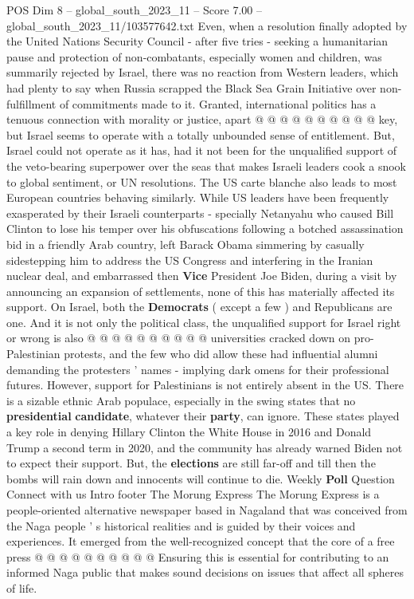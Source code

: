 \begin{textsample}{POS Dim 8 – global\_south\_2023\_11 – Score 7.00 – global\_south\_2023\_11/103577642.txt}
Even, when a resolution finally adopted by the United Nations Security Council - after five tries - seeking a humanitarian pause and protection of non-combatants, especially women and children, was summarily rejected by Israel, there was no reaction from Western leaders, which had plenty to say when Russia scrapped the Black Sea Grain Initiative over non-fulfillment of commitments made to it.
Granted, international politics has a tenuous connection with morality or justice, apart @ @ @ @ @ @ @ @ @ @ key, but Israel seems to operate with a totally unbounded sense of entitlement.
But, Israel could not operate as it has, had it not been for the unqualified support of the veto-bearing superpower over the seas that makes Israeli leaders cook a snook to global sentiment, or UN resolutions.
The US carte blanche also leads to most European countries behaving similarly.
While US leaders have been frequently exasperated by their Israeli counterparts - specially Netanyahu who caused Bill Clinton to lose his temper over his obfuscations following a botched assassination bid in a friendly Arab country, left Barack Obama simmering by casually sidestepping him to address the US Congress and interfering in the Iranian nuclear deal, and embarrassed then \textbf{Vice} President Joe Biden, during a visit by announcing an expansion of settlements, none of this has materially affected its support.
On Israel, both the \textbf{Democrats} ( except a few ) and Republicans are one.
And it is not only the political class, the unqualified support for Israel right or wrong is also @ @ @ @ @ @ @ @ @ @ universities cracked down on pro-Palestinian protests, and the few who did allow these had influential alumni demanding the protesters ' names - implying dark omens for their professional futures.
However, support for Palestinians is not entirely absent in the US.
There is a sizable ethnic Arab populace, especially in the swing states that no \textbf{presidential} \textbf{candidate}, whatever their \textbf{party}, can ignore.
These states played a key role in denying Hillary Clinton the White House in 2016 and Donald Trump a second term in 2020, and the community has already warned Biden not to expect their support.
But, the \textbf{elections} are still far-off and till then the bombs will rain down and innocents will continue to die.
Weekly \textbf{Poll} Question Connect with us Intro footer The Morung Express The Morung Express is a people-oriented alternative newspaper based in Nagaland that was conceived from the Naga people ' s historical realities and is guided by their voices and experiences.
It emerged from the well-recognized concept that the core of a free press @ @ @ @ @ @ @ @ @ @ Ensuring this is essential for contributing to an informed Naga public that makes sound decisions on issues that affect all spheres of life.

\end{textsample}
